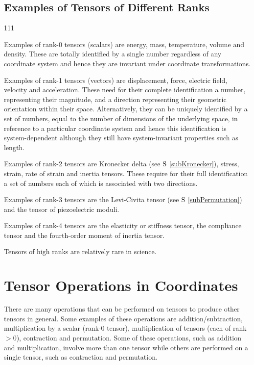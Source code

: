 \subsection{Examples of Tensors of Different Ranks}
\begin{dinglist}{111}
 \item Examples of rank-0 tensors (scalars) are energy, mass,
temperature, volume and density. These are totally identified by a
single number regardless of any coordinate system and hence they are
invariant under coordinate transformations.

 \item Examples of rank-1 tensors (vectors) are displacement,
force, electric field, velocity and acceleration. These need for their
complete identification a number, representing their magnitude, and
a direction representing their geometric orientation within their
space. Alternatively, they can be uniquely identified by a set of
numbers, equal to the number of dimensions of the underlying space,
in reference to a particular coordinate system and hence this identification
is system-dependent although they still have system-invariant properties
such as length.

 \item Examples of rank-2 tensors are Kronecker delta (see $\S$
\ref{subKronecker}), stress, strain, rate of strain and inertia tensors.
These require for their full identification a set of numbers each
of which is associated with two directions.

 \item Examples of rank-3 tensors are the Levi-Civita tensor (see
$\S$ \ref{subPermutation}) and the tensor of piezoelectric moduli.

 \item Examples of rank-4 tensors are the elasticity or stiffness
tensor, the compliance tensor and the fourth-order moment of inertia
tensor.

 \item Tensors of high ranks are relatively rare in science.
\end{dinglist}


\section{Tensor Operations in Coordinates}

 There are many operations that can be performed on tensors
to produce other tensors in general. Some examples of these operations
are addition/subtraction, multiplication by a scalar (rank-0 tensor),
multiplication of tensors (each of rank $>0$), contraction and permutation.
Some of these operations, such as addition and multiplication, involve
more than one tensor while others are performed on a single tensor,
such as contraction and permutation.

